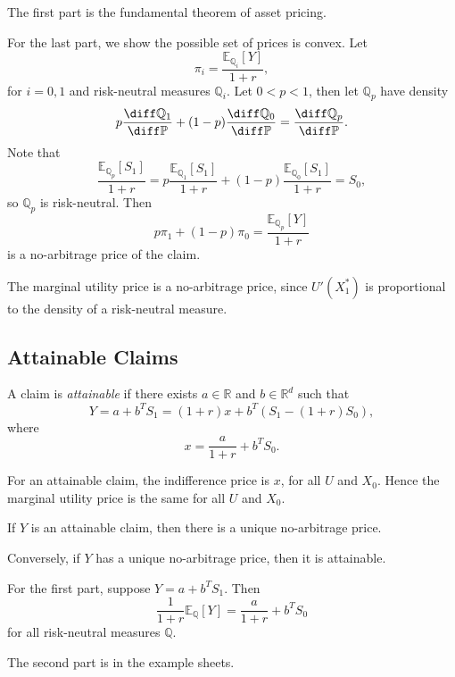 \documentclass[12pt]{article}
\begin{document}
\begin{proofbox}
	The first part is the fundamental theorem of asset pricing.

	For the last part, we show the possible set of prices is convex. Let
	\[
	\pi_i = \frac{\mathbb{E}_{\mathbb{Q}_i}[Y]}{1 + r},
	\]
	for $i = 0, 1$ and risk-neutral measures $\mathbb{Q}_i$. Let $0 < p < 1$, then let $\mathbb{Q}_p$ have density
	\[
	p \frac{\diff \mathbb{Q}_1}{\diff \mathbb{P}} + (1-p) \frac{\diff \mathbb{Q}_0}{\diff \mathbb{P}} = \frac{\diff \mathbb{Q}_p}{\diff \mathbb{P}}.
	\]
	Note that
	\[
	\frac{\mathbb{E}_{\mathbb{Q}_p}[S_1]}{1 + r} = p \frac{\mathbb{E}_{\mathbb{Q}_1}[S_1]}{1 + r} + (1-p) \frac{\mathbb{E}_{\mathbb{Q}_0}[S_1]}{1+r} = S_0,
	\]
	so $\mathbb{Q}_p$ is risk-neutral. Then
	\[
		p \pi_1 + (1-p) \pi_0 = \frac{\mathbb{E}_{\mathbb{Q}_p}[Y]}{1 + r}
	\]
	is a no-arbitrage price of the claim.
\end{proofbox}

\begin{remark}
	The marginal utility price is a no-arbitrage price, since $U'(X_1^{\ast})$ is proportional to the density of a risk-neutral measure.
\end{remark}

\subsection{Attainable Claims}
\label{sub:att_claim}

\begin{definition}
	A claim is \emph{attainable} if there exists $a \in \mathbb{R}$ and $b \in \mathbb{R}^d$ such that
	\[
	Y = a + b^{T} S_1 = (1+r)x  + b^{T}(S_1 - (1+r)S_0),
	\]
	where
	\[
	x = \frac{a}{1 + r} + b^{T}S_0.
	\]
\end{definition}

For an attainable claim, the indifference price is $x$, for all $U$ and $X_0$. Hence the marginal utility price is the same for all $U$ and $X_0$.

\begin{theorem}
	If $Y$ is an attainable claim, then there is a unique no-arbitrage price.

	Conversely, if $Y$ has a unique no-arbitrage price, then it is attainable.
\end{theorem}

\begin{proofbox}
	For the first part, suppose $Y = a + b^{T}S_1$. Then
	\[
	\frac{1}{1 + r} \mathbb{E}_{\mathbb{Q}}[Y] = \frac{a}{1 + r} + b^{T}S_0
	\]
	for all risk-neutral measures $\mathbb{Q}$.

	The second part is in the example sheets.
\end{proofbox}
\end{document}
